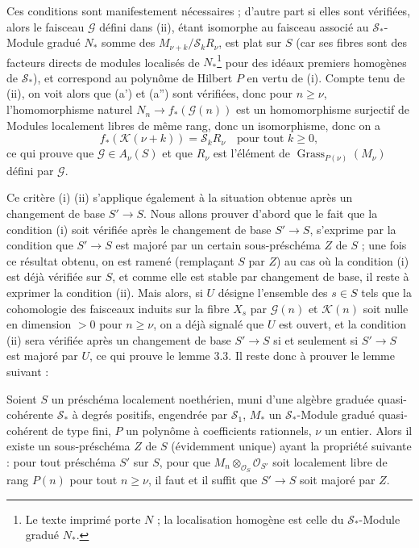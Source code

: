 Ces conditions sont manifestement nécessaires ; d'autre part si elles sont
vérifiées, alors le faisceau $\mathcal G$ défini dans (ii), étant isomorphe au
faisceau associé au $\mathcal S_*$-Module gradué $N_*$ somme des
$M_{\nu+k}/\mathcal S_kR_\nu$, est plat sur $S$ (car ses fibres sont des
facteurs directs de modules localisés de $N_*$\footnote{Le texte imprimé porte $N$ ; la localisation homogène est celle du $\mathcal S_*$-Module gradué $N_*$.} pour des idéaux premiers homogènes
de $\mathcal S_*$), et correspond au polynôme de Hilbert $P$ en vertu de (i).
Compte tenu de (ii), on voit alors que (a') et (a'') sont vérifiées, donc pour
$n\geq\nu$, l'homomorphisme naturel
$N_n\longrightarrow f_*(\mathcal G(n))$ est un homomorphisme surjectif de
Modules localement libres de même rang, donc un isomorphisme, donc on a
\[
f_*(\mathcal K(\nu+k))=\mathcal S_kR_\nu
\quad\text{pour tout $k\geq0$},
\]
ce qui prouve que $\mathcal G\in A_\nu(S)$ et que $R_\nu$ est l'élément de
$\operatorname{Grass}_{P(\nu)}(M_\nu)$ défini par $\mathcal G$.

Ce critère (i) (ii) s'applique également à la situation obtenue après un
changement de base $S'\longrightarrow S$. Nous allons prouver d'abord que le
fait que la condition (i) soit vérifiée après le changement de base
$S'\longrightarrow S$, s'exprime par la condition que $S'\longrightarrow S$
est majoré par un certain sous-préschéma $Z$ de $S$ ; une fois ce résultat
obtenu, on est ramené (remplaçant $S$ par $Z$) au cas où la condition (i) est
déjà vérifiée sur $S$, et comme elle est stable par changement de base, il
reste à exprimer la condition (ii). Mais alors, si $U$ désigne l'ensemble des
$s\in S$ tels que la cohomologie des faisceaux induits sur la fibre $X_s$ par
$\mathcal G(n)$ et $\mathcal K(n)$ soit nulle en dimension $>0$ pour
$n\geq\nu$, on a déjà signalé que $U$ est ouvert, et la condition (ii) sera
vérifiée après un changement de base $S'\longrightarrow S$ si et seulement si
$S'\longrightarrow S$ est majoré par $U$, ce qui prouve le lemme 3.3. Il reste
donc à prouver le lemme suivant :

 Soient $S$ un préschéma localement noethérien, muni d'une
algèbre graduée quasi-cohérente $\mathcal S_*$ à degrés positifs, engendrée par
$\mathcal S_1$, $M_*$ un $\mathcal S_*$-Module gradué quasi-cohérent de type
fini, $P$ un polynôme à coefficients rationnels, $\nu$ un entier. Alors il
existe un sous-préschéma $Z$ de $S$ (évidemment unique)
ayant la propriété suivante : pour tout préschéma $S'$ sur $S$, pour que
$M_n\otimes_{\mathcal O_S}\mathcal O_{S'}$ soit localement libre de rang $P(n)$
pour tout $n\geq\nu$, il faut et il suffit que $S'\longrightarrow S$ soit majoré
par $Z$.

